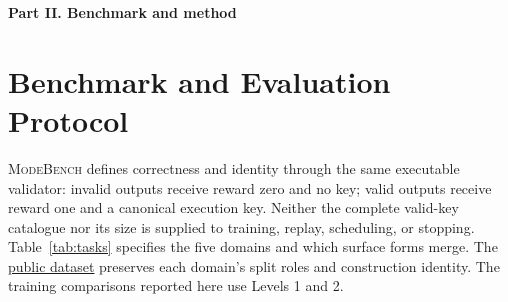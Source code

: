 \documentclass{article}
\newcommand{\1}{\mathbf 1}
\newcommand{\mb}{\textsc{ModeBench}}
\theoremstyle{remark}
\theoremstyle{definition}
\theoremstyle{plain}
\begin{document}

\clearpage
{}
\begin{center}\large\textbf{Part II. Benchmark and method}\end{center}

\section{Benchmark and Evaluation Protocol}
\label{app:data}
\label{app:experimental-design}
\label{app:domain-overview}
\label{app:data-inventory}

\mb{} defines correctness and identity through the same executable validator:
invalid outputs receive reward zero and no key; valid outputs receive reward
one and a canonical execution key. Neither the complete valid-key catalogue
nor its size is supplied to training, replay, scheduling, or stopping.
Table~\ref{tab:tasks} specifies the five domains and which surface forms merge.
The \href{https://huggingface.co/datasets/od2961/ModeBench}{public dataset}
preserves each domain's split roles and construction identity. The training
comparisons reported here use Levels 1 and 2.
\end{document}
